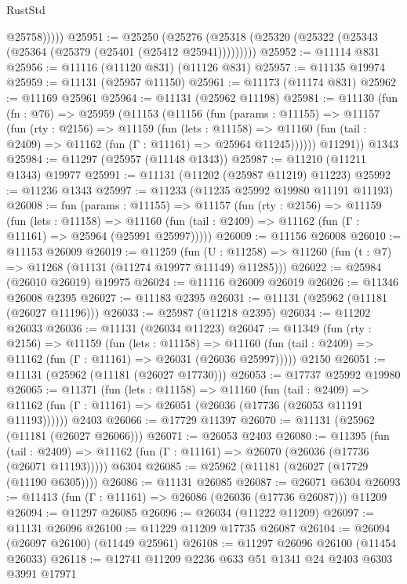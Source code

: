 \begin{lexlean}{RustStd}
\begin{coremodule}
              @25758)))))
@25951 := @25250
    (@25276 (@25318 (@25320 (@25322 (@25343 (@25364 (@25379 (@25401 (@25412 @25941)))))))))
@25952 := @11114 @831
@25956 := @11116 (@11120 @831) (@11126 @831)
@25957 := @11135 @19974
@25959 := @11131 (@25957 @11150)
@25961 := @11173 (@11174 @831)
@25962 := @11169 @25961
@25964 := @11131 (@25962 @11198)
@25981 := @11130
    (fun (fn : @76) =>
    @25959
      (@11153
        (@11156
          (fun (params : @11155) =>
          @11157
            (fun (rty : @2156) =>
            @11159
              (fun (lets : @11158) =>
              @11160 (fun (tail : @2409) => @11162 (fun (Γ : @11161) => @25964 @11245))))))
        @11291))
    @1343
@25984 := @11297 (@25957 (@11148 @1343))
@25987 := @11210 (@11211 @1343) @19977
@25991 := @11131 (@11202 (@25987 @11219) @11223)
@25992 := @11236 @1343
@25997 := @11233 (@11235 @25992 @19980 @11191 @11193)
@26008 := fun (params : @11155) =>
  @11157
    (fun (rty : @2156) =>
    @11159
      (fun (lets : @11158) =>
      @11160 (fun (tail : @2409) => @11162 (fun (Γ : @11161) => @25964 (@25991 @25997)))))
@26009 := @11156 @26008
@26010 := @11153 @26009
@26019 := @11259
    (fun (U : @11258) => @11260 (fun (t : @7) => @11268 (@11131 (@11274 @19977 @11149) @11285)))
@26022 := @25984 (@26010 @26019) @19975
@26024 := @11116 @26009 @26019
@26026 := @11346 @26008 @2395
@26027 := @11183 @2395
@26031 := @11131 (@25962 (@11181 (@26027 @11196)))
@26033 := @25987 (@11218 @2395)
@26034 := @11202 @26033
@26036 := @11131 (@26034 @11223)
@26047 := @11349
    (fun (rty : @2156) =>
    @11159
      (fun (lets : @11158) =>
      @11160 (fun (tail : @2409) => @11162 (fun (Γ : @11161) => @26031 (@26036 @25997)))))
    @2150
@26051 := @11131 (@25962 (@11181 (@26027 @17730)))
@26053 := @17737 @25992 @19980
@26065 := @11371
    (fun (lets : @11158) =>
    @11160
      (fun (tail : @2409) =>
      @11162 (fun (Γ : @11161) => @26051 (@26036 (@17736 (@26053 @11191 @11193))))))
    @2403
@26066 := @17729 @11397
@26070 := @11131 (@25962 (@11181 (@26027 @26066)))
@26071 := @26053 @2403
@26080 := @11395
    (fun (tail : @2409) => @11162 (fun (Γ : @11161) => @26070 (@26036 (@17736 (@26071 @11193)))))
    @6304
@26085 := @25962 (@11181 (@26027 (@17729 (@11190 @6305))))
@26086 := @11131 @26085
@26087 := @26071 @6304
@26093 := @11413 (fun (Γ : @11161) => @26086 (@26036 (@17736 @26087))) @11209
@26094 := @11297 @26085
@26096 := @26034 (@11222 @11209)
@26097 := @11131 @26096
@26100 := @11229 @11209 @17735 @26087
@26104 := @26094 (@26097 @26100) (@11449 @25961)
@26108 := @11297 @26096 @26100 (@11454 @26033)
@26118 := @12741 @11209 @2236 @633 @51 @1341 @24 @2403 @6303 @3991 @17971

\end{coremodule}
\end{lexlean}

